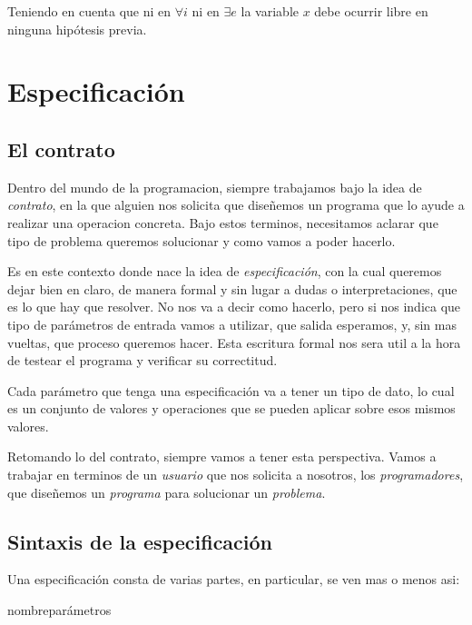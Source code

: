 \documentclass{article}
\begin{document}
Teniendo en cuenta que ni en $\forall i$ ni en $\exists e$ la variable $x$ debe ocurrir libre en ninguna hipótesis previa.

\newpage
\section{Especificación}

\subsection{El contrato}

Dentro del mundo de la programacion, siempre trabajamos bajo la idea de \textit{contrato}, en la que alguien nos solicita que diseñemos un programa que lo ayude a realizar una operacion concreta. Bajo estos terminos, necesitamos aclarar que tipo de problema queremos solucionar y como vamos a poder hacerlo.

Es en este contexto donde nace la idea de \textit{especificación}, con la cual queremos dejar bien en claro, de manera formal y sin lugar a dudas o interpretaciones, que es lo que hay que resolver. No nos va a decir como hacerlo, pero si nos indica que tipo de parámetros de entrada vamos a utilizar, que salida esperamos, y, sin mas vueltas, que proceso queremos hacer. Esta escritura formal nos sera util a la hora de testear el programa y verificar su correctitud.

Cada parámetro que tenga una especificación va a tener un tipo de dato, lo cual es un conjunto de valores y operaciones que se pueden aplicar sobre esos mismos valores.

Retomando lo del contrato, siempre vamos a tener esta perspectiva. Vamos a trabajar en terminos de un \textit{usuario} que nos solicita a nosotros, los \textit{programadores}, que diseñemos un \textit{programa} para solucionar un \textit{problema}.

\subsection{Sintaxis de la especificación}

Una especificación consta de varias partes, en particular, se ven mas o menos asi:

\begin{proc}{nombre}{parámetros}

	
\end{proc}
\end{document}
